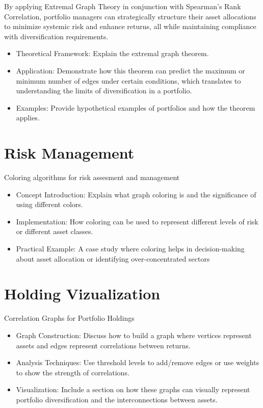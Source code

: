 \documentclass{article}
\begin{document}
By applying Extremal Graph Theory in conjunction with Spearman's Rank Correlation, portfolio managers can strategically structure their asset allocations to minimize systemic risk and enhance returns, all while maintaining compliance with diversification requirements.

\begin{itemize}
    \item Theoretical Framework: Explain the extremal graph theorem.
    \item Application: Demonstrate how this theorem can predict the maximum or minimum number of edges under certain conditions, which translates to understanding the limits of diversification in a portfolio.
    \item Examples: Provide hypothetical examples of portfolios and how the theorem applies.
\end{itemize}


\section{Risk Management}
Coloring algorithms for risk assesment and management

\begin{itemize}
    \item Concept Introduction: Explain what graph coloring is and the significance of using different colors.
    \item Implementation: How coloring can be used to represent different levels of risk or different asset classes.
    \item Practical Example: A case study where coloring helps in decision-making about asset allocation or identifying over-concentrated sectors
\end{itemize}


\section{Holding Vizualization}

Correlation Graphs for Portfolio Holdings

\begin{itemize}
    \item Graph Construction: Discuss how to build a graph where vertices represent assets and edges represent correlations between returns.
    \item Analysis Techniques: Use threshold levels to add/remove edges or use weights to show the strength of correlations.
    \item Visualization: Include a section on how these graphs can visually represent portfolio diversification and the interconnections between assets.
\end{itemize}
\end{document}
